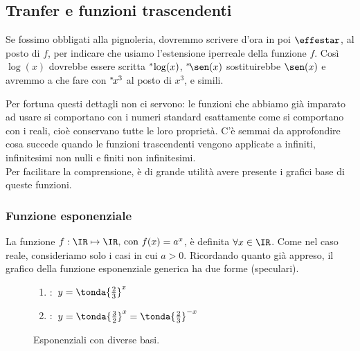 \subsection{Tranfer e funzioni trascendenti}
\label{subsec:insnum_ftrascendenti}
Se fossimo obbligati alla pignoleria, dovremmo scrivere d'ora in poi 
$\effestar$, al posto di $f$, per indicare che usiamo l'estensione iperreale della 
funzione $f$. 
Così $\log(x)$ dovrebbe essere scritta ${}^*\hspace{-.15em}\log(x)$, 
${}^*\hspace{-.15em}\sen(x)$ sostituirebbe $\sen(x)$ e avremmo a che
fare con ${}^*\hspace{-.15em}x^3$ al posto di $x^3$, e simili.

Per fortuna questi dettagli non ci servono: le funzioni che abbiamo già 
imparato ad usare si comportano con i numeri standard esattamente come si 
comportano con i reali, cioè conservano tutte le loro proprietà.
C'è semmai da approfondire cosa succede quando le funzioni trascendenti 
vengono applicate a infiniti, infinitesimi non nulli e finiti non infinitesimi.\\
Per facilitare la comprensione, è di grande utilità avere presente i grafici 
base di queste funzioni.

\subsubsection{Funzione esponenziale}
\label{subsubsec:insnum_expstar}
La funzione $f:\IR\mapsto \IR \text{, con } f(x)= a^x$, è definita $\forall x \in \IR$.
Come nel caso reale, consideriamo solo i casi in cui $a>0$.  Ricordando quanto già appreso, 
il grafico della funzione esponenziale generica ha due forme (speculari). \\

\begin{figure}[h]
\begin{minipage}{.69\textwidth}
 \begin{inaccessibleblock}
  \espdueterzi
 \end{inaccessibleblock}
\end{minipage}
\hspace{12pt}
\begin{minipage}{.20\textwidth}
 \begin{enumerate} [label=\alph*]
   \item :~$y=\tonda{\frac{2}{3}}^x$
   \item :~$y=\tonda{\frac{3}{2}}^x=\tonda{\frac{2}{3}}^{-x}$
 \end{enumerate}
\end{minipage}
  \caption{Esponenziali con diverse basi.} \label{fig:diversebasi}
\end{figure}

